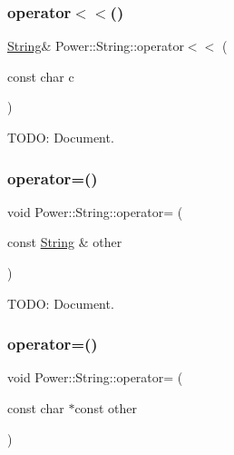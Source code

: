 \subsubsection{\texorpdfstring{operator$<$$<$()}{operator<<()}\hspace{0.1cm}{\footnotesize\ttfamily [3/3]}}
{\footnotesize\ttfamily \hyperlink{class_power_1_1_string}{String}\& Power\+::\+String\+::operator$<$$<$ (\begin{DoxyParamCaption}\item[{const char}]{c }\end{DoxyParamCaption})\hspace{0.3cm}{\ttfamily [inline]}}



T\+O\+DO\+: Document. 

\mbox{\label{class_power_1_1_string_ac0ec7adf5e627919b560ce591add0644}} 
\subsubsection{\texorpdfstring{operator=()}{operator=()}\hspace{0.1cm}{\footnotesize\ttfamily [1/3]}}
{\footnotesize\ttfamily void Power\+::\+String\+::operator= (\begin{DoxyParamCaption}\item[{const \hyperlink{class_power_1_1_string}{String} \&}]{other }\end{DoxyParamCaption})\hspace{0.3cm}{\ttfamily [inline]}}



T\+O\+DO\+: Document. 

\mbox{\label{class_power_1_1_string_abf5f2db360bf2c1853bccfcc8e2d3225}} 
\subsubsection{\texorpdfstring{operator=()}{operator=()}\hspace{0.1cm}{\footnotesize\ttfamily [2/3]}}
{\footnotesize\ttfamily void Power\+::\+String\+::operator= (\begin{DoxyParamCaption}\item[{const char $\ast$const}]{other }\end{DoxyParamCaption})\hspace{0.3cm}{\ttfamily [inline]}}



